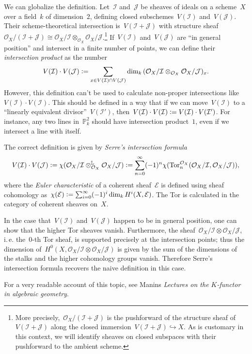 \documentclass{amsart}
\makeatletter
\newcommand*{\sectionsummary}[1]{\etoctoccontentsline{sectionsummary}{#1}}
\theoremstyle{definition}
\theoremstyle{plain}
\theoremstyle{remark}
\newcommand{\C}{\mathcal{C}}
\newcommand{\E}{\mathcal{E}}
\renewcommand{\O}{\mathcal{O}}
\newcommand{\I}{\mathcal{I}}
\newcommand{\J}{\mathcal{J}}
\newcommand{\RR}{\mathbb{R}}
\newcommand{\LL}{\mathbb{L}}
\newcommand{\PP}{\mathbb{P}}
\newcommand{\Tor}{\mathrm{Tor}}
\newcommand{\?}{\,{:}\,}
\renewcommand{\_}{\mathpunct{.}\,}
\newcommand{\ie}{i.\,e.\@\xspace}
\newcommand{\ip}{\cdot}
\newcommand{\defeq}{\vcentcolon=}
\makeatother
\begin{document}
We can globalize the definition. Let~$\I$ and~$\J$ be sheaves of ideals on a
scheme~$X$ over a field~$k$ of dimension~$2$, defining closed
subschemes~$V(\I)$ and~$V(\J)$.  Their scheme-theoretical intersection is~$V(\I
+ \J)$ with structure sheaf~$\O_X/(\I + \J) \cong \O_X/\I \otimes_{\O_X}
\O_X/\J$.\footnote{More precisely,~$\O_X/(\I + \J)$ is the pushforward of the
structure sheaf of~$V(\I + \J)$ along the closed immersion~$V(\I + \J)
\hookrightarrow X$. As is customary in this context, we will identify sheaves
on closed subspaces with their pushforward to the ambient scheme.} If~$V(\I)$
and~$V(\J)$ are ``in general position'' and intersect in a finite number of
points, we can define their \emph{intersection product} as the number
\[ V(\I) \ip V(\J) \defeq \sum_{x \in V(\I) \cap V(\J)}
  \dim_k\, (\O_X/\I \otimes_{\O_X} \O_X/\J)_x. \]
However, this definition can't be used to calculate non-proper intersections
like $V(\I) \ip V(\I)$. This should be defined in a way that if we can
move~$V(\I)$ to a ``linearly equivalent divisor''~$V(\I')$, then~$V(\I) \ip
V(\I) \defeq V(\I) \ip V(\I')$. For instance, any two lines in~$\PP^2_k$ should
have intersection product~$1$, even if we intersect a line with itself.

The correct definition is given by \emph{Serre's intersection formula}
\[ V(\I) \ip V(\J) \defeq \chi(\O_X/\I \otimes^\LL_{\O_X} \O_X/\J) \defeq
  \sum_{n=0}^\infty (-1)^n \chi(\Tor_n^{\O_X}(\O_X/\I,\O_X/\J)), \]
where the \emph{Euler characteristic} of a coherent sheaf~$\E$ is defined
using sheaf cohomology as~$\chi(\E) \defeq \sum_{i=0}^\infty (-1)^i \dim_k
H^i(X, \E)$. The Tor is calculated in the category of coherent sheaves on~$X$.

In the case that~$V(\I)$ and~$V(\J)$ happen to be in general position, one can
show that the higher Tor sheaves vanish. Furthermore, the sheaf~$\O_X/\I
\otimes \O_X/\J$, \ie the~$0$-th Tor sheaf, is supported precisely at the intersection
points; thus the dimension of~$H^0(X, \O_X/\I \otimes \O_X/\J)$ is given by the
sum of the dimensions of the stalks and the higher cohomology groups vanish.
Therefore Serre's intersection formula recovers the naive definition in this
case.

For a very readable account of this topic, see Manins \emph{Lectures on the
$K$-functor in algebraic geometry}.

%
\end{document}
